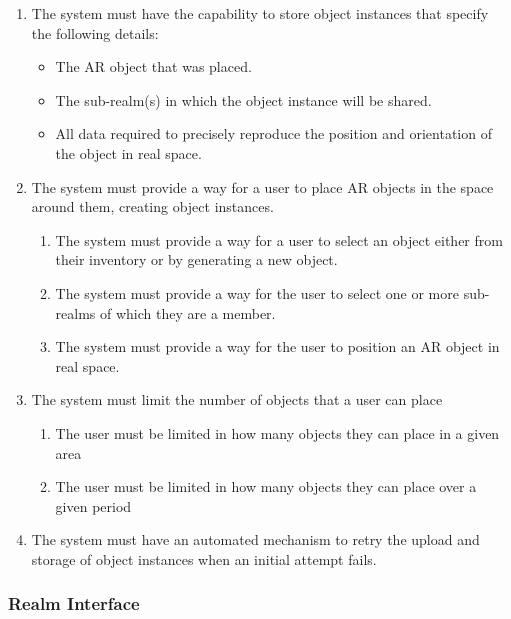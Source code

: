 \documentclass{article}
\begin{document}
\begin{enumerate}[align=left, label=\textbf{OP-FR\arabic*:}]
    \item The system must have the capability to store object instances that specify the following details:
          \begin{itemize}
              \item The AR object that was placed.
              \item The sub-realm(s) in which the object instance will be shared.
              \item All data required to precisely reproduce the position and orientation of the object in real space.
          \end{itemize}

    \item The system must provide a way for a user to place AR objects in the space around them, creating object instances.
          \begin{enumerate}[align=left, label=\textbf{OP-FR2.\arabic*:}]
              \item The system must provide a way for a user to select an object either from their inventory or by generating a new object.
              \item The system must provide a way for the user to select one or more sub-realms of which they are a member.
              \item The system must provide a way for the user to position an AR object in real space.
          \end{enumerate}

    \item The system must limit the number of objects that a user can place
          \begin{enumerate}[align=left, label=\textbf{OP-FR3.\arabic*:}]
              \item The user must be limited in how many objects they can place in a given area
              \item The user must be limited in how many objects they can place over a given period
          \end{enumerate}

    \item The system must have an automated mechanism to retry the upload and storage of object instances when an initial attempt fails. \\
\end{enumerate}

\subsubsection{Realm Interface}
\label{ssub:realm_interface}
\end{document}
